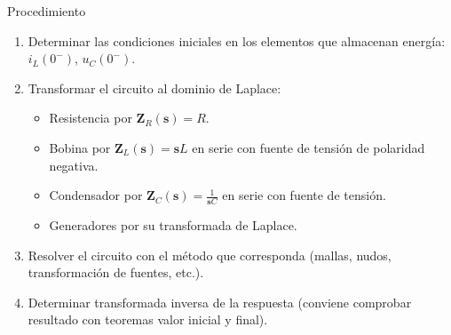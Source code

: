 \documentclass[xcolor={usenames,svgnames,dvipsnames}]{beamer}
\newcommand{\slp}{\mathbf{s}}
\begin{document}
\begin{frame}[label={sec:orgfae0d41}]{Procedimiento}
\begin{enumerate}
\item Determinar las \alert{condiciones iniciales} en los elementos que almacenan energía: \(i_L(0^-)\), \(u_C(0^-)\).
\item \alert{Transformar} el circuito \alert{al dominio de Laplace}:
\begin{itemize}
\item Resistencia por \(\mathbf{Z}_R(\slp) = R\).
\item Bobina por \(\mathbf{Z}_L(\slp) = \slp L\) en serie con fuente de tensión de polaridad negativa.
\item Condensador por \(\mathbf{Z}_C(\slp) = \frac{1}{\slp C}\) en serie con fuente de tensión.
\item Generadores por su transformada de Laplace.
\end{itemize}
\item \alert{Resolver el circuito} con el método que corresponda (mallas, nudos, transformación de fuentes, etc.).
\item Determinar \alert{transformada inversa} de la respuesta (conviene comprobar resultado con teoremas valor inicial y final).
\end{enumerate}
\end{frame}
\end{document}
